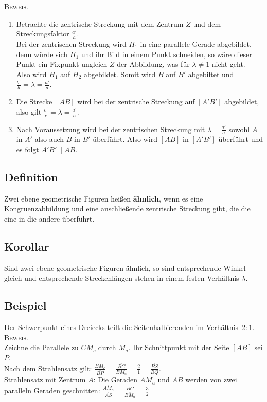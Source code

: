 	
	\textsc{Beweis.}
	\begin{enumerate}
	\item Betrachte die zentrische Streckung mit dem Zentrum $Z$ und dem Streckungsfaktor $\frac{a'}{a}$.\\
	Bei der zentrischen Streckung wird $H_1$ in eine parallele Gerade abgebildet, denn würde sich $H_1$ und ihr
	Bild in einem Punkt schneiden, so wäre dieser Punkt ein Fixpunkt ungleich $Z$ der Abbildung, was für
	$\lambda\neq 1$ nicht geht.\\
	Also wird $H_1$ auf $H_2$ abgebildet. Somit wird $B$ auf $B'$ abgebiltet und 
	$\frac{b'}{b}=\lambda=\frac{a'}{a}$.	
	
	\item Die Strecke $[AB]$ wird bei der zentrische Streckung auf $[A'B']$ abgebildet, also gilt
	$\frac{c'}{c}=\lambda=\frac{a'}{a}$.
	
	\item Nach Voraussetzung wird bei der zentrischen Streckung mit $\lambda=\frac{a'}{a}$ sowohl $A$ in $A'$
	also auch $B$ in $B'$ überführt. Also wird $[AB]$ in $[A'B']$ überführt und es folgt $A'B'\parallel AB$.
	\end{enumerate}
	
	
\subsection[Ähnlichkeit]{Definition}

	Zwei ebene geometrische Figuren heißen \textbf{ähnlich}, wenn es eine Kongruenzabbildung und eine
	anschließende zentrische Streckung gibt, die die eine in die andere überführt.
	
	
\subsection{Korollar}

	Sind zwei ebene geometrische Figuren ähnlich, so sind entsprechende Winkel gleich und entsprechende
	Streckenlängen stehen in einem festen Verhältnis $\lambda$.
	
	
\subsection{Beispiel}

	Der Schwerpunkt eines Dreiecks teilt die Seitenhalbierenden im \mbox{Verhältnis $2:1$}.\\
	\newline
	\textsc{Beweis.}\\
	Zeichne die Parallele zu $CM_c$ durch $M_a$. Ihr Schnittpunkt mit der Seite $[AB]$ sei $P$.\\
	Nach dem Strahlensatz gilt: $\frac{\overline{BM_c}}{\overline{BP}}=\frac{\overline{BC}}{BM_a}=\frac{2}{1}
	=\frac{\overline{BS}}{BQ}$.\\
	Strahlensatz mit Zentrum $A$: Die Geraden $AM_a$ und $AB$ werden von zwei paralleln Geraden geschnitten:
	$\frac{\overline{AM_a}}{\overline{AS}}=\frac{\overline{BC}}{\overline{BM_a}}=\frac{3}{2}$
	
